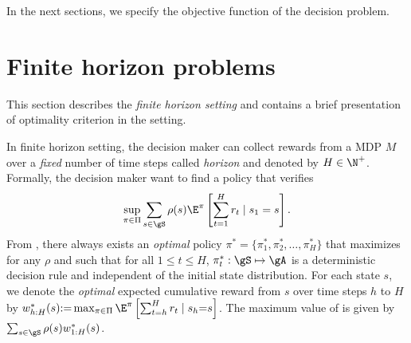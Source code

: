 In the next sections, we specify the objective function of the decision problem.


\section{Finite horizon problems}
\label{ch:mdp:sec:finite}

This section describes the \emph{finite horizon setting} and contains a brief presentation of optimality criterion in the setting.

In finite horizon setting, the decision maker can collect rewards from a MDP $M$ over a \emph{fixed} number of time steps called \emph{horizon} and denoted by $H\in\N^+$.
Formally, the decision maker want to find a policy that verifies
\begin{equation}
    \label{eq:finite_obj}
    \sup_{\pi\in\Pi}\sum_{s\in\gS}\rho(s)\E^\pi\left[\sum_{t=1}^H r_t\mid s_1=s\right].
\end{equation}
From \cite[Chapter~4]{puterman2014markov}, there always exists an \emph{optimal} policy $\pi^*=\{\pi_1^*,\pi_2^*,\dots,\pi^*_H\}$ that maximizes  for any $\rho$ and such that for all $1\le t\le H$, $\pi_t^*:\gS\mapsto\gA$ is a deterministic decision rule and independent of the initial state distribution.
For each state $s$, we denote the \emph{optimal} expected cumulative reward from $s$ over time steps $h$ to $H$ by $w_{h:H}^{*}(s){:=}\max_{\pi\in\Pi}\E^{\pi}\left[\sum_{t=h}^H r_t\mid s_h{=}s\right]$.
The maximum value of  is given by $\sum_{s\in\gS}\rho(s)w_{1:H}^*(s)$.

